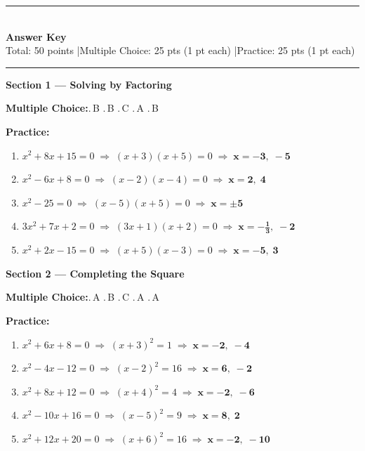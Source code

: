 \documentclass[12pt,letterpaper]{article}
\begin{document}
\newpage
\begin{center}
  {\color{navyblue}\rule{\linewidth}{2pt}}\\[6pt]
  {\Large\bfseries\color{navyblue} Answer Key}\\[4pt]
  {\small Total: 50 points \quad|\quad Multiple Choice: 25 pts (1 pt each) \quad|\quad Practice: 25 pts (1 pt each)}\\[4pt]
  {\color{navyblue}\rule{\linewidth}{2pt}}
\end{center}

\textbf{\color{navyblue}Section 1 --- Solving by Factoring}

\smallskip
\textbf{Multiple Choice:}.\,B .\,B .\,C .\,A .\,B

\smallskip
\textbf{Practice:}
\begin{enumerate}[label=\arabic*., leftmargin=*, itemsep=3pt, topsep=2pt]
  \item $x^2+8x+15=0 \;\Rightarrow\; (x+3)(x+5)=0 \;\Rightarrow\; \boldsymbol{x=-3,\;-5}$
  \item $x^2-6x+8=0 \;\Rightarrow\; (x-2)(x-4)=0 \;\Rightarrow\; \boldsymbol{x=2,\;4}$
  \item $x^2-25=0 \;\Rightarrow\; (x-5)(x+5)=0 \;\Rightarrow\; \boldsymbol{x=\pm 5}$
  \item $3x^2+7x+2=0 \;\Rightarrow\; (3x+1)(x+2)=0 \;\Rightarrow\; \boldsymbol{x=-\tfrac{1}{3},\;-2}$
  \item $x^2+2x-15=0 \;\Rightarrow\; (x+5)(x-3)=0 \;\Rightarrow\; \boldsymbol{x=-5,\;3}$
\end{enumerate}

\vspace{6pt}
\textbf{\color{navyblue}Section 2 --- Completing the Square}

\smallskip
\textbf{Multiple Choice:}.\,A .\,B .\,C .\,A .\,A

\smallskip
\textbf{Practice:}
\begin{enumerate}[label=\arabic*., leftmargin=*, itemsep=3pt, topsep=2pt]
  \item $x^2+6x+8=0 \;\Rightarrow\; (x+3)^2=1 \;\Rightarrow\; \boldsymbol{x=-2,\;-4}$
  \item $x^2-4x-12=0 \;\Rightarrow\; (x-2)^2=16 \;\Rightarrow\; \boldsymbol{x=6,\;-2}$
  \item $x^2+8x+12=0 \;\Rightarrow\; (x+4)^2=4 \;\Rightarrow\; \boldsymbol{x=-2,\;-6}$
  \item $x^2-10x+16=0 \;\Rightarrow\; (x-5)^2=9 \;\Rightarrow\; \boldsymbol{x=8,\;2}$
  \item $x^2+12x+20=0 \;\Rightarrow\; (x+6)^2=16 \;\Rightarrow\; \boldsymbol{x=-2,\;-10}$
\end{enumerate}
\end{document}
